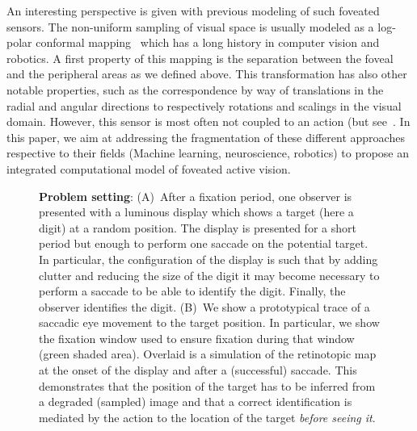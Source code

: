 An interesting perspective is given with previous modeling of such foveated sensors. The non-uniform sampling of visual space is usually modeled as a log-polar conformal mapping~\citep{Traver10} which has a long history in computer vision and robotics. A first property of this mapping is the separation between the foveal and the peripheral areas as we defined above. This transformation has also other notable properties, such as the correspondence by way of translations in the radial and angular directions to respectively rotations and scalings in the visual domain. However, this sensor is most often not coupled to an action (but see~\citep{ref needed)}. In this paper, we aim at addressing the fragmentation of these different approaches respective to their fields (Machine learning, neuroscience, robotics) to propose an integrated computational model of foveated active vision.
\begin{figure}%
\caption{
{\bf Problem setting}:
(A)~After a fixation period, one observer is presented with a luminous display which shows a target (here a digit) at a random position. The display is presented for a short period but enough to perform one saccade on the potential target. In particular, the configuration of the display is such that by adding clutter and reducing the size of the digit it may become necessary to perform a saccade to be able to identify the digit. Finally, the observer identifies the digit.
(B)~We show a prototypical trace of a saccadic eye movement to the target position. In particular, we show the fixation window used to ensure fixation during that window (green shaded area). Overlaid is a simulation of the retinotopic map at the onset of the display and after a (successful) saccade. This demonstrates that the position of the target has to be inferred from a degraded (sampled) image and that a correct identification is mediated by the action to the location of the target \emph{before seeing it}.
\label{fig:intro}}%
\end{figure}%
